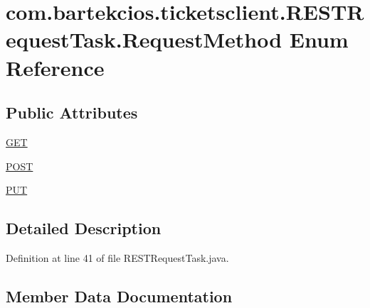 \hypertarget{enumcom_1_1bartekcios_1_1ticketsclient_1_1_r_e_s_t_request_task_1_1_request_method}{}\section{com.\+bartekcios.\+ticketsclient.\+R\+E\+S\+T\+Request\+Task.\+Request\+Method Enum Reference}
\label{enumcom_1_1bartekcios_1_1ticketsclient_1_1_r_e_s_t_request_task_1_1_request_method}
\subsection*{Public Attributes}
\begin{DoxyCompactItemize}
\item 
\hyperlink{enumcom_1_1bartekcios_1_1ticketsclient_1_1_r_e_s_t_request_task_1_1_request_method_a6b092386d81c5d1f94e6e600eec7f6cf}{G\+ET}
\item 
\hyperlink{enumcom_1_1bartekcios_1_1ticketsclient_1_1_r_e_s_t_request_task_1_1_request_method_a55f5aa810c2acea4348cdc2d7165d343}{P\+O\+ST}
\item 
\hyperlink{enumcom_1_1bartekcios_1_1ticketsclient_1_1_r_e_s_t_request_task_1_1_request_method_a38909500e1499bba79e90881f7ddb756}{P\+UT}
\end{DoxyCompactItemize}


\subsection{Detailed Description}


Definition at line 41 of file R\+E\+S\+T\+Request\+Task.\+java.



\subsection{Member Data Documentation}
\mbox{\label{enumcom_1_1bartekcios_1_1ticketsclient_1_1_r_e_s_t_request_task_1_1_request_method_a6b092386d81c5d1f94e6e600eec7f6cf}} 
